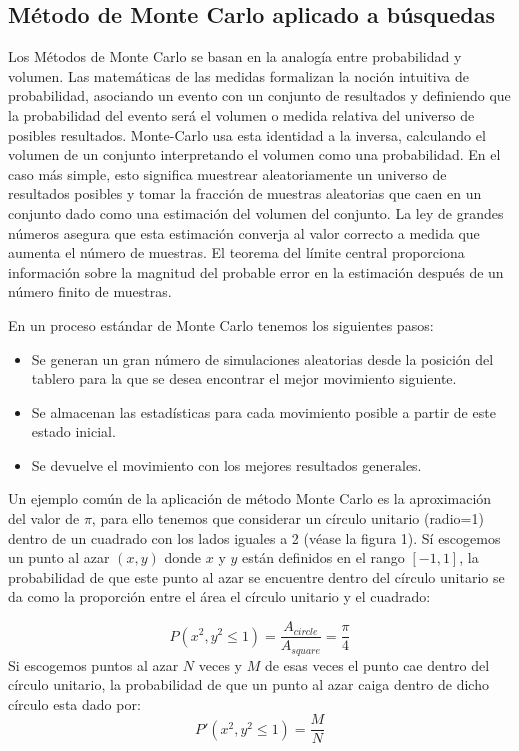\documentclass[runningheads,a4paper]{llncs}
\begin{document}
\subsection{M\'etodo de Monte Carlo aplicado a b\'usquedas}

Los M\'etodos de Monte Carlo se basan en la analog\'ia entre probabilidad y volumen. Las matem\'aticas de las medidas formalizan la noci\'on intuitiva de probabilidad, asociando un evento con un conjunto de resultados y definiendo que la probabilidad del evento ser\'a el volumen o medida relativa del universo de posibles resultados. Monte-Carlo usa esta identidad a la inversa, calculando el volumen de un conjunto interpretando el volumen como una probabilidad. En el caso m\'as simple, esto significa muestrear aleatoriamente un universo de resultados posibles y tomar la fracci\'on de muestras aleatorias que caen en un conjunto dado como una estimaci\'on del volumen del conjunto. La ley de grandes n\'umeros asegura que esta estimaci\'on converja al valor correcto a medida que aumenta el n\'umero de muestras. El teorema del l\'imite central proporciona informaci\'on sobre la magnitud del probable error en la estimaci\'on despu\'es de un n\'umero finito de muestras.

En un proceso est\'andar de Monte Carlo tenemos los siguientes pasos:
\begin{itemize}
\item Se generan un gran n\'umero de simulaciones aleatorias desde la posici\'on del tablero para la que se desea encontrar el mejor movimiento siguiente.
\item Se almacenan las estad\'isticas para cada movimiento posible a partir de este estado inicial.
\item Se devuelve el movimiento con los mejores resultados generales.

\end{itemize}

Un ejemplo com\'un de la aplicaci\'on de m\'etodo Monte Carlo es la aproximaci\'on del valor de  $\pi$, para ello tenemos que considerar un c\'irculo unitario (radio=1) dentro de un cuadrado con los lados iguales a 2 (v\'ease la figura 1). S\'i escogemos un punto al azar $(x,y)$ donde $x$ y $y$ est\'an definidos en el rango $[-1,1]$, la probabilidad de que este punto al azar se encuentre dentro del c\'irculo unitario se da como la proporci\'on entre el \'area el c\'irculo unitario y el cuadrado:

\begin{equation}
P(x^2, y^2 \leq 1) = \frac{A_{circle}}{A_{square}} = \frac{\pi}{4}
\end{equation}
Si escogemos puntos al azar $N$ veces y $M$ de esas veces el punto cae dentro del c\'irculo unitario, la probabilidad de que un punto al azar caiga dentro de dicho c\'irculo esta dado por:
\begin{equation}
P'(x^2, y^2 \leq 1) = \frac{M}{N}
\end{equation}
\end{document}

